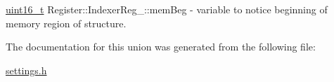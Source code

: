 \mbox{\label{unionRegister_1_1IndexerReg___ab61397dfa5cf6bbc29d9642c3875967f}} 
{\footnotesize\ttfamily \mbox{\hyperlink{settings_8h_a017dd44e68049ffdd31500a8cd01ba68}{uint16\+\_\+t}} Register\+::\+Indexer\+Reg\+\_\+\+::\texorpdfstring{mem\+Beg}{memBeg}} - variable to notice beginning of memory region of structure.

The documentation for this union was generated from the following file\+:\begin{DoxyCompactItemize}
\item 
\mbox{\hyperlink{settings_8h}{settings.\+h}}\end{DoxyCompactItemize}
\newpage
